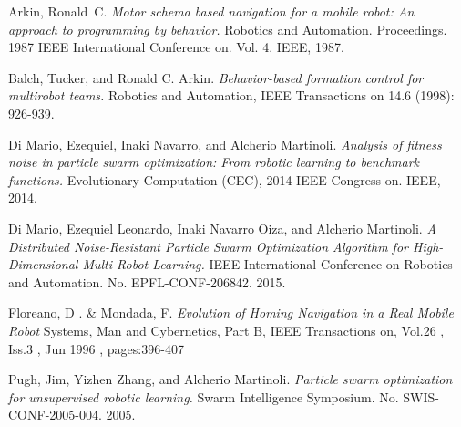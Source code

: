 \documentclass[journal]{IEEEtran}
\begin{document}
%
%
%
\begin{thebibliography}{1}

Arkin, Ronald~C. \emph{Motor schema based navigation for a mobile
  robot: An approach to programming by behavior.} 
Robotics and Automation. Proceedings. 1987 IEEE International Conference on. Vol. 4. IEEE, 1987.

Balch, Tucker, and Ronald C. Arkin. \emph{Behavior-based formation
  control for multirobot teams.}
 Robotics and Automation, IEEE Transactions on 14.6 (1998): 926-939.

Di Mario, Ezequiel, Inaki Navarro, and Alcherio
Martinoli. \emph{Analysis of fitness noise in particle swarm
  optimization: From robotic learning to benchmark functions.}
 Evolutionary Computation (CEC), 2014 IEEE Congress on. IEEE, 2014.

Di Mario, Ezequiel Leonardo, Inaki Navarro Oiza, and Alcherio
Martinoli. 
\emph{A Distributed Noise-Resistant Particle Swarm Optimization
  Algorithm for High-Dimensional Multi-Robot Learning.}
 IEEE International Conference on Robotics and Automation. No. EPFL-CONF-206842. 2015.

Floreano, D . \& Mondada, F. \emph{Evolution of Homing Navigation in a Real
Mobile Robot} Systems, Man and Cybernetics, Part B, IEEE Transactions
on, Vol.26 , Iss.3 , Jun 1996 , pages:396-407

Pugh, Jim, Yizhen Zhang, and Alcherio Martinoli. \emph{Particle swarm
  optimization for unsupervised robotic learning.}
 Swarm Intelligence Symposium. No. SWIS-CONF-2005-004. 2005.

\end{thebibliography}

% 
\end{document}
